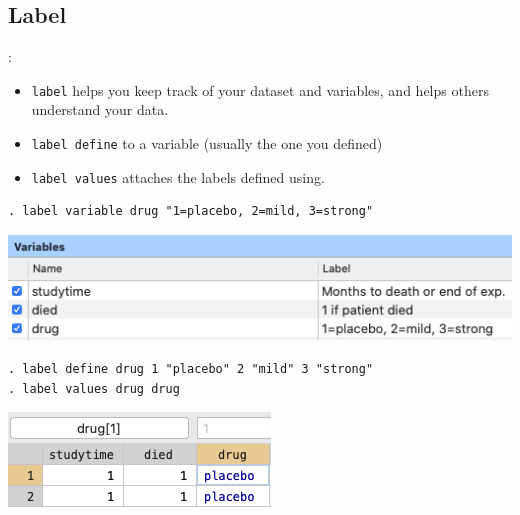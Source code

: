 \documentclass{beamer}
\begin{document}
\subsection{Label}
\begin{frame}[fragile]{\secname : \subsecname}
\begin{itemize}
	\item 	\verb|label| helps you keep track of your dataset and variables, and helps others understand your data. 
	\item \verb|label define| to a variable (usually the one you defined)
	\item \verb|label values| attaches the labels defined using. 
\end{itemize}

\small
\begin{verbatim}
. label variable drug "1=placebo, 2=mild, 3=strong"
\end{verbatim}

\begin{center}
	\includegraphics[scale=0.4]{image/label_var}
\end{center}


\begin{verbatim}
. label define drug 1 "placebo" 2 "mild" 3 "strong"
. label values drug drug
\end{verbatim}
\begin{center}
	\includegraphics[scale=0.3]{image/label_def}
\end{center}
\end{frame}

\end{document}
